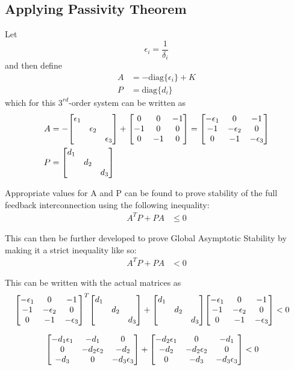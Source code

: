 \documentclass[letter]{article}
\numberwithin{equation}{section}
\begin{document}
\newpage
\subsection{Applying Passivity Theorem}
Let $$\epsilon_i = \frac{1}{\delta_i}$$ and then define
\begin{align}
	A &= - \text{diag}\{\epsilon_i\} + K\\
	P &= \text{diag}\{d_i\}
\end{align}
which for this $3^{rd}$-order system can be written as
\begin{align}
	A &= -\mqty[\dmat{\epsilon_1}{\epsilon_2}{\epsilon_3}] + \mqty[0 & 0 &-1\\ -1 & 0 & 0\\ 0 &-1 & 0] 
	= \mqty[-\epsilon_1 & 0 &-1\\
	-1 &-\epsilon_2 &0\\
	0	&-1	&-\epsilon_3]\\
	P &= \mqty[\dmat{d_1}{d_2}{d_3}]
\end{align}

Appropriate values for A and P can be found to prove stability of the full feedback interconnection using the following inequality:
\begin{align}
	A^T P + P A &\leq 0
\end{align}

This can then be further developed to prove Global Asymptotic Stability by making it a strict inequality like so:
\begin{align}
	A^T P + P A &< 0
\end{align}

This can be written with the actual matrices as
\begin{align}
	\mqty[-\epsilon_1 & 0 &-1\\
	-1 &-\epsilon_2 &0\\
	0	&-1	&-\epsilon_3]^T
	\mqty[\dmat{d_1}{d_2}{d_3}] +
	\mqty[\dmat{d_1}{d_2}{d_3}]
	\mqty[-\epsilon_1 & 0 &-1\\
	-1 &-\epsilon_2 &0\\
	0	&-1	&-\epsilon_3]
	&< 0
\end{align}

\begin{align}
	\mqty[-d_1\epsilon_1 & -d_1 &0\\
	0 &-d_2\epsilon_2 &-d_2\\
	-d_3	&0	&-d_3\epsilon_3]+
	\mqty[-d_2\epsilon_1 & 0 &-d_1\\
	-d_2 &-d_2\epsilon_2 &0\\
	0	&-d_3	&-d_3\epsilon_3]
	&< 0
\end{align}
\end{document}
